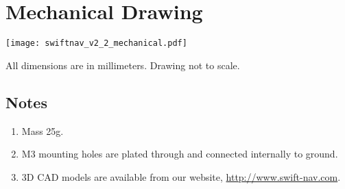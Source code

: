 \documentclass{article}
\begin{document}
\section*{Mechanical Drawing}
\begin{center}
  \texttt{[image: swiftnav\_v2\_2\_mechanical.pdf]}
\end{center}

All dimensions are in millimeters. Drawing not to scale.

\subsection*{Notes}
\begin{enumerate}
  \item Mass 25g.
  \item M3 mounting holes are plated through and connected internally to ground.
  \item 3D CAD models are available from our website, \url{http://www.swift-nav.com}.
\end{enumerate}
\end{document}
